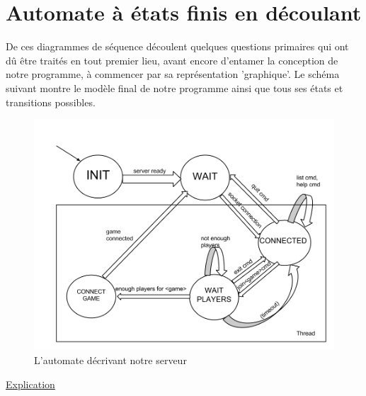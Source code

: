 
\section{Automate à états finis en découlant}

De ces diagrammes de séquence découlent quelques questions primaires qui ont dû être traités en tout premier lieu, avant encore d'entamer la conception de notre programme, à commencer par sa représentation 'graphique'. Le schéma suivant montre le modèle final de notre programme ainsi que tous ses états et transitions possibles.\\


\begin{figure}[!ht]
	\center
	\includegraphics[scale=0.5]{images/state_machine_server.png}
	\caption{L'automate décrivant notre serveur}
\end{figure}


\underline{Explication}\\


